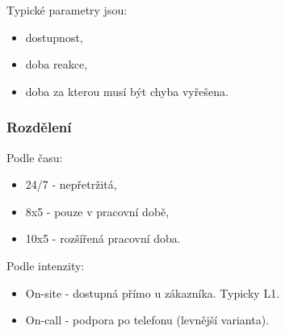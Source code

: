         Typické parametry jsou:
        \begin{itemize}
          \item dostupnost,
          \item doba reakce,
          \item doba za kterou musí být chyba vyřešena.
        \end{itemize}

      \subsubsection{Rozdělení}
        Podle času:
        \begin{itemize}
          \item 24/7 - nepřetržitá,
          \item 8x5 - pouze v pracovní době,
          \item 10x5 - rozšířená pracovní doba.
        \end{itemize}

        Podle intenzity:
        \begin{itemize}
          \item On-site - dostupná přímo u zákazníka. Typicky L1.
          \item On-call - podpora po telefonu (levnější varianta).
        \end{itemize}
